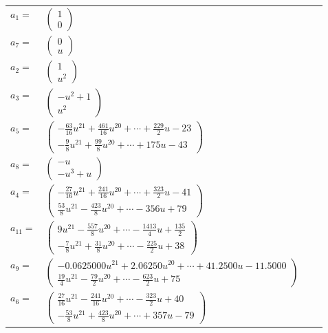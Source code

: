 \documentclass[1p]{elsarticle_modified}
\theoremstyle{definition}
\begin{document}
\begin{tabular}{m{7pt} m{180pt} m{7pt} m{180pt} }
\flushright $a_{1}=$&$\begin{pmatrix}1\\0\end{pmatrix}$ \\
\flushright $a_{7}=$&$\begin{pmatrix}0\\u\end{pmatrix}$ \\
\flushright $a_{2}=$&$\begin{pmatrix}1\\u^2\end{pmatrix}$ \\
\flushright $a_{3}=$&$\begin{pmatrix}- u^2+1\\u^2\end{pmatrix}$ \\
\flushright $a_{5}=$&$\begin{pmatrix}-\frac{63}{16} u^{21}+\frac{461}{16} u^{20}+\cdots+\frac{229}{2} u-23\\-\frac{9}{8} u^{21}+\frac{99}{8} u^{20}+\cdots+175 u-43\end{pmatrix}$ \\
\flushright $a_{8}=$&$\begin{pmatrix}- u\\- u^3+u\end{pmatrix}$ \\
\flushright $a_{4}=$&$\begin{pmatrix}-\frac{27}{16} u^{21}+\frac{241}{16} u^{20}+\cdots+\frac{323}{2} u-41\\\frac{53}{8} u^{21}-\frac{423}{8} u^{20}+\cdots-356 u+79\end{pmatrix}$ \\
\flushright $a_{11}=$&$\begin{pmatrix}9 u^{21}-\frac{557}{8} u^{20}+\cdots-\frac{1413}{4} u+\frac{135}{2}\\-\frac{7}{8} u^{21}+\frac{31}{8} u^{20}+\cdots-\frac{225}{2} u+38\end{pmatrix}$ \\
\flushright $a_{9}=$&$\begin{pmatrix}-0.0625000 u^{21}+2.06250 u^{20}+\cdots+41.2500 u-11.5000\\\frac{19}{4} u^{21}-\frac{79}{2} u^{20}+\cdots-\frac{623}{2} u+75\end{pmatrix}$ \\
\flushright $a_{6}=$&$\begin{pmatrix}\frac{27}{16} u^{21}-\frac{241}{16} u^{20}+\cdots-\frac{323}{2} u+40\\-\frac{53}{8} u^{21}+\frac{423}{8} u^{20}+\cdots+357 u-79\end{pmatrix}$ \\

\end{tabular}
\end{document}
